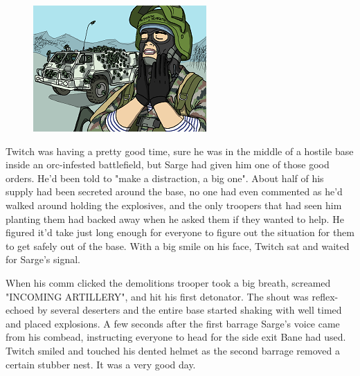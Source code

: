 \begin{figure}
	\begin{center}
		\includegraphics[width=\figwidth]{pics/9/32.png}
	\end{center}
\end{figure}
Twitch was having a pretty good time, sure he was in the middle of a hostile base inside an orc-infested battlefield, but Sarge had given him one of those good orders. 
He'd been told to "make a distraction, a big one". 
About half of his supply had been secreted around the base, no one had even commented as he'd walked around holding the explosives, and the only troopers that had seen him planting them had backed away when he asked them if they wanted to help. 
He figured it'd take just long enough for everyone to figure out the situation for them to get safely out of the base. 
With a big smile on his face, Twitch sat and waited for Sarge's signal. 


When his comm clicked the demolitions trooper took a big breath, screamed "INCOMING ARTILLERY", and hit his first detonator. 
The shout was reflex-echoed by several deserters and the entire base started shaking with well timed and placed explosions. 
A few seconds after the first barrage Sarge's voice came from his combead, instructing everyone to head for the side exit Bane had used. 
Twitch smiled and touched his dented helmet as the second barrage removed a certain stubber nest. 
It was a very good day.

